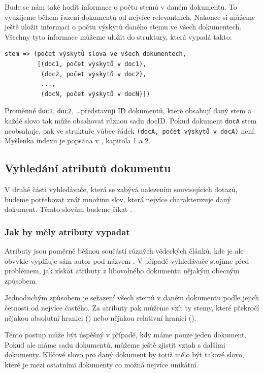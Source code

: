 \documentclass[12pt]{article}
\newcommand{\code}[1]{\texttt{#1}}
\begin{document}
Bude se nám také hodit informace o počtu stemů v daném dokumentu. To využijeme během řazení dokumentů od nejvíce relevantních. Nakonec si můžeme ještě uložit informaci o počtu výskytů daného stemu ve všech dokumentech. Všechny tyto informace můžeme uložit do struktury, která vypadá takto: 

\begin{verbatim}
stem => (počet výskytů slova ve všech dokumentech, 
         [(doc1, počet výskytů v doc1), 
          (doc2, počet výskytů v doc2), 
          ..., 
          (docN, počet výskytů v docN)])
\end{verbatim}

Proměnné \code{doc1}, \code{doc2}, \dots představují ID dokumentů, které obsahují daný stem a každé slovo tak může obsahovat různou sadu docID. Pokud dokument \code{docA} stem neobsahuje, pak ve struktuře vůbec řádek \code{(docA, počet výskytů v docA)} není. Myšlenka indexu je popsána v \cite{introir}, kapitola 1 a 2.

\subsection{Vyhledání atributů dokumentu} 

V druhé části vyhledávače, která se zabývá nalezením souvisejících dotazů, budeme potřebovat znát množinu slov, která nejvíce charakterizuje daný dokument. Těmto slovům budeme říkat . 

\subsubsection{Jak by měly atributy vypadat}

Atributy jsou poměrně běžnou součástí různých vědeckých článků, kde je ale obvykle vyplňuje sám autor pod názvem . V případě vyhledávače stojíme před problémem, jak získat atributy z libovolného dokumentu nějakým obecným způsobem. 

Jednoduchým způsobem je seřazení všech stemů v daném dokumentu podle jejich četnosti od nejvíce častého. Za atributy pak můžeme vzít ty stemy, které překročí nějakou absolutní hranici () nebo nějakou relativní hranici (). 

Tento postup může být úspěšný v případě, kdy máme pouze jeden dokument. Pokud ale máme sadu dokumentů, můžeme ještě zjistit vztah s dalšími dokumenty. Klíčové slovo pro daný dokument by totiž mělo být takové slovo, které je mezi ostatními dokumenty co možná nejvíce unikátní. 
\end{document}
